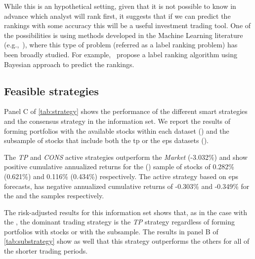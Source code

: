 \documentclass[a4paper,twoside,12pt,openright,notitlepage]{report}\usepackage[]{graphicx}\usepackage[]{color}
\begin{document}
While this is an hypothetical setting, given that it is not possible to know in advance which analyst will rank first, it suggests that if we can predict the rankings with some accuracy this will be a useful investment trading tool. One of the possibilities is using methods developed in the Machine Learning literature (e.g.,~\cite{aiguzhinov2010,brazdil2003}), where this type of problem (referred as a label ranking problem) has been broadly studied. For example,~\cite{aiguzhinov2010} propose a label ranking algorithm using Bayesian approach to predict the rankings.



\subsection{Feasible strategies}
Panel C of \ref{tab:strategy} shows the performance of the different smart strategies and the consensus strategy in the \naive{} information set. We report the results of forming portfolios with the available stocks within each dataset (\all{}) and the subsample of stocks that include both the \gls{tp} or the \gls{eps} datasets (\same{}).

The \textit{TP} and \textit{CONS} active strategies outperform the \textit{Market} (-3.032\%)  and show positive cumulative annualized returns for the \all{} (\same{}) sample of stocks of 0.282\% (0.621\%) and  0.116\% (0.434\%) respectively. The active strategy based on \gls{eps} forecasts, has negative annualized cumulative returns of  -0.303\% and -0.349\% for the \all{} and the \same{} samples respectively.

The risk-adjusted results for this information set shows that, as in the case with the \tr{}, the dominant trading strategy is the \textit{TP} strategy regardless of forming portfolios with \all{} stocks or with the \same{} subsample.
The results in panel B of \ref{tab:substrategy} show as well that this strategy outperforms the others for all of the shorter trading periods.
\end{document}
